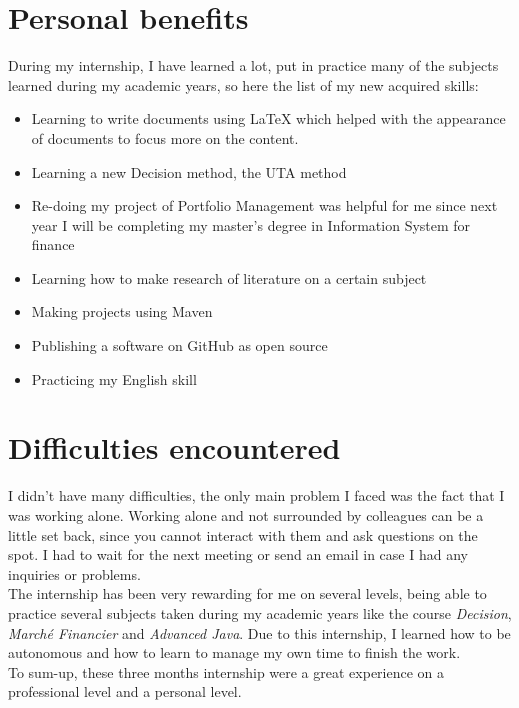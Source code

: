 \documentclass{report}
\begin{document}
\section{Personal benefits}
During my internship, I have learned a lot, put in practice many of the subjects learned during my academic years, so here the list of my new acquired skills: 
\begin{itemize}
\item Learning to write documents using LaTeX which helped with the appearance of documents to focus more on the content. 
\item Learning a new Decision method, the UTA method
\item Re-doing my project of Portfolio Management was helpful for me since next year I will be completing my master’s degree in Information System for finance
\item Learning how to make research of literature on a certain subject 
\item Making projects using Maven
\item Publishing a software on GitHub as open source
\item Practicing my English skill\\
\end{itemize}

\section{Difficulties encountered}
I didn't have many difficulties, the only main problem I faced was the fact that I was working alone. Working alone and not surrounded by colleagues can be a little set back, since you cannot interact with them and ask questions on the spot. I had to wait for the next meeting or send an email in case I had any inquiries or problems.\\


The internship has been very rewarding for me on several levels, being able to practice several subjects taken during my academic years like the course \textit{Decision}, \textit{Marché Financier} and \textit{Advanced Java}. Due to this internship, I learned how to be autonomous and how to learn to manage my own time to finish the work.\\
To sum-up, these three months internship were a great experience on a professional level and a personal level.
\end{document}

